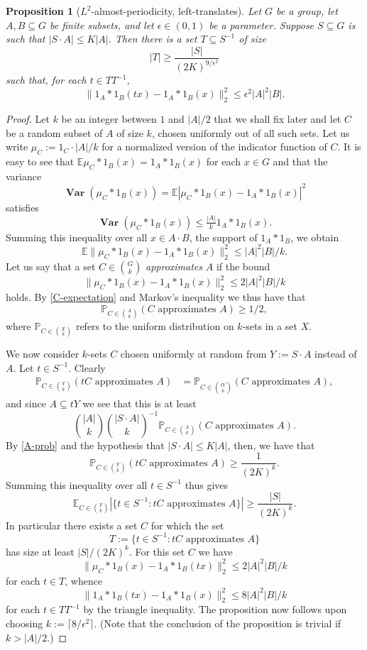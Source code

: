 \documentclass[12pt,a4paper,reqno]{amsart}
\numberwithin{equation}{section}
\theoremstyle{plain}
\newtheorem{proposition}[theorem]{Proposition}
\theoremstyle{definition}
\renewcommand{\leq}{\leqslant}
\renewcommand{\geq}{\geqslant}
\renewcommand{\subset}{\subseteq}
\def\E{\mathbb{E}}
\def\P{\mathbb{P}}
\DeclareMathOperator{\Var}{\mathbf{Var}}
\providecommand{\norm}[1]{\lVert#1\rVert}
\begin{document}
\begin{proposition}[$L^2$-almost-periodicity, left-translates]\label{L_2-local-left}
Let $G$ be a group, let $A, B \subset G$ be finite subsets, and let $\epsilon \in (0,1)$ be a parameter. Suppose $S \subset G$ is such that $|S \cdot A| \leq K|A|$. Then there is a set $T \subset S^{-1}$ of size 
\[ |T| \geq \frac{|S|}{(2K)^{9/\epsilon^2}} \]
such that, for each $t \in T T^{-1}$,
\[ \norm{ 1_A*1_B(tx) - 1_A*1_B(x) }_2^2 \leq \epsilon^2 |A|^2 |B|. \]
\end{proposition} 
\begin{proof}
Let $k$ be an integer between $1$ and $|A|/2$ that we shall fix later and let $C$ be a random subset of $A$ of size $k$, chosen uniformly out of all such sets. Let us write $\mu_C := 1_C\cdot|A|/k$ for a normalized version of the indicator function of $C$. It is easy to see that $\E \mu_C*1_B(x) = 1_A*1_B(x)$ for each $x \in G$ and that the variance
\[ \Var(\mu_C*1_B(x)) = \E |\mu_C*1_B(x) - 1_A*1_B(x)|^2 \]
satisfies
\[ \Var(\mu_C*1_B(x)) \leq \tfrac{|A|}{k} 1_A*1_B(x). \]
Summing this inequality over all $x \in A \cdot B$, the support of $1_A*1_B$, we obtain
\begin{equation} \E \norm{ \mu_C*1_B(x) - 1_A*1_B(x) }_2^2 \leq |A|^2 |B|/k. \label{C-expectation}\end{equation}
Let us say that a set $C \in \binom{G}{k}$ \emph{approximates} $A$ if the bound
\[ \norm{ \mu_C*1_B(x) - 1_A*1_B(x) }_2^2 \leq 2|A|^2 |B|/k \]
holds. By \eqref{C-expectation} and Markov's inequality we thus have that
\begin{equation} \P_{C \in \binom{A}{k}}( \text{$C$ approximates $A$} ) \geq 1/2, \label{A-prob}\end{equation}
where $\P_{C \in \binom{X}{k}}$ refers to the uniform distribution on $k$-sets in a set $X$.

We now consider $k$-sets $C$ chosen uniformly at random from $Y := S \cdot A$ instead of $A$. Let $t \in S^{-1}$. Clearly
\begin{align*}
\P_{C \in \binom{Y}{k}}( \text{$tC$ approximates $A$} ) &= \P_{C \in \binom{tY}{k}}( \text{$C$ approximates $A$} ),
\end{align*}
and since $A \subset tY$ we see that this is at least
\[ \binom{|A|}{k} \binom{|S \cdot A|}{k}^{-1} \P_{C \in \binom{A}{k}}( \text{$C$ approximates $A$} ). \]
By \eqref{A-prob} and the hypothesis that $|S \cdot A| \leq K|A|$, then, we have that
\[ \P_{C \in \binom{Y}{k}}( \text{$tC$ approximates $A$} ) \geq \frac{1}{(2K)^k}. \]
Summing this inequality over all $t \in S^{-1}$ thus gives
\[ \E_{C \in \binom{Y}{k}} | \{ t \in S^{-1} : \text{$tC$ approximates $A$} \} | \geq \frac{|S|}{(2K)^k}. \]
In particular there exists a set $C$ for which the set 
\[ T := \{ t \in S^{-1} : \text{$tC$ approximates $A$} \} \]
has size at least $|S|/(2K)^k$. For this set $C$ we have 
\[ \norm{ \mu_C*1_B(x) - 1_A*1_B(tx) }_2^2 \leq 2|A|^2|B|/k \]
for each $t \in T$, whence
\[ \norm{ 1_A*1_B(tx) - 1_A*1_B(x) }_2^2 \leq 8|A|^2|B|/k \]
for each $t \in TT^{-1}$ by the triangle inequality. The proposition now follows upon choosing $k := \lceil 8/\epsilon^2 \rceil$. (Note that the conclusion of the proposition is trivial if $k > |A|/2$.)
\end{proof}
\end{document}
